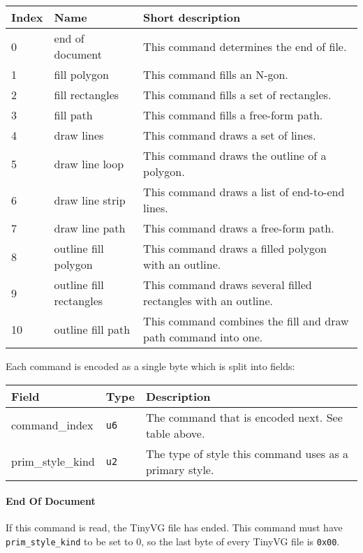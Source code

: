\documentclass[]{article}
\begin{document}
\begin{longtable}[]{@{}p{0.5in}p{1.25in}p{4.25in}@{}}
\toprule
Index & Name & Short description \\
\midrule
\endhead
0 & end of document & This command determines the end of file. \\
1 & fill polygon & This command fills an N-gon. \\
2 & fill rectangles & This command fills a set of rectangles. \\
3 & fill path & This command fills a free-form path. \\
4 & draw lines & This command draws a set of lines. \\
5 & draw line loop & This command draws the outline of a polygon. \\
6 & draw line strip & This command draws a list of end-to-end lines. \\
7 & draw line path & This command draws a free-form path. \\
8 & outline fill polygon & This command draws a filled polygon with an outline. \\
9 & outline fill rectangles & This command draws several filled rectangles with an outline. \\
10 & outline fill path & This command combines the fill and draw path command into one. \\
\bottomrule
\end{longtable}

Each command is encoded as a single byte which is split into fields:

\begin{longtable}[]{@{}p{1.5in}p{0.5in}p{4in}@{}}
\toprule
Field & Type & Description \\
\midrule
\endhead
command\_index & \texttt{u6} & The command that is encoded next. See table above. \\
prim\_style\_kind & \texttt{u2} & The type of style this command uses as a primary style. \\
\bottomrule
\end{longtable}

\hypertarget{end-of-document}{\paragraph{End Of Document}\label{end-of-document}}

If this command is read, the TinyVG file has ended. This command must
have \texttt{prim\_style\_kind} to be set to 0, so the last byte of
every TinyVG file is \texttt{0x00}.
\end{document}
